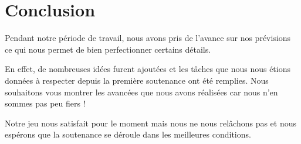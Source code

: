 \documentclass{article}
\begin{document}
\section{Conclusion}
\par
Pendant notre période de travail, nous avons pris de l’avance sur nos prévisions ce qui nous permet de bien perfectionner certains détails.
\par
En effet, de nombreuses idées furent ajoutées  et les tâches que nous nous étions données à respecter depuis la première soutenance ont été remplies. Nous souhaitons vous montrer les avancées que nous avons réalisées car nous n’en sommes pas peu fiers !
\par
Notre jeu nous satisfait pour le moment mais nous ne nous relâchons pas et nous espérons que la soutenance se déroule dans les meilleures conditions.
\end{document}
